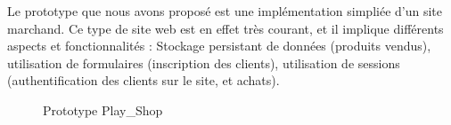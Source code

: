 Le prototype que nous avons proposé est une implémentation simpliée d'un site marchand. Ce type de site web est en effet très courant, et il implique différents aspects et fonctionnalités : Stockage persistant de données (produits vendus), utilisation de formulaires (inscription des clients), utilisation de sessions (authentification des clients sur le site, et achats).

\begin{figure}[htb]
  \centering
  \caption{Prototype Play\_Shop}
  \label{fig:pro}
\end{figure}





